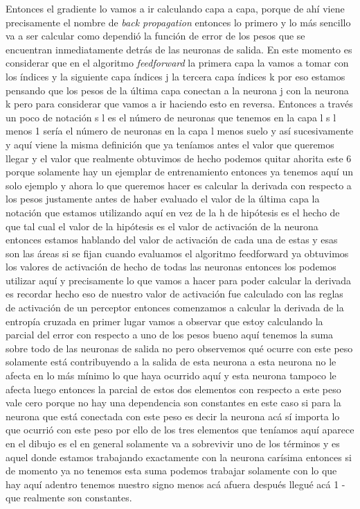 Entonces el gradiente lo vamos a ir calculando capa a capa, porque de ahí viene precisamente el nombre de \emph{back propagation} entonces lo primero y lo más sencillo va a ser calcular como dependió la función de error de los pesos que se encuentran inmediatamente detrás de las neuronas de salida. En este momento es considerar que en el algoritmo \emph{feedforward} la primera capa la vamos a tomar con los índices y la siguiente capa índices j la tercera capa índices k por eso estamos pensando que los pesos de la última capa conectan a la neurona j con la neurona k pero para considerar que vamos a ir haciendo esto en reversa. 
Entonces a través un poco de notación s l es el número de neuronas que tenemos en la capa l s l menos 1 sería el número de neuronas en la capa l menos suelo y así sucesivamente y aquí viene la misma definición que ya teníamos antes el valor que queremos llegar y el valor que realmente obtuvimos de hecho podemos quitar ahorita este 6 porque solamente hay un ejemplar de entrenamiento entonces ya tenemos aquí un solo ejemplo y ahora lo que queremos hacer es calcular la derivada con respecto a los pesos justamente antes de haber evaluado el valor de la última capa la notación que estamos utilizando aquí en vez de la h de hipótesis es el hecho de que tal cual el valor de la hipótesis es el valor de activación de la neurona entonces estamos hablando del valor de activación de cada una de estas y esas son las áreas si se fijan cuando evaluamos el algoritmo feedforward ya obtuvimos los valores de activación de hecho de todas las neuronas entonces los podemos utilizar aquí y precisamente lo que vamos a hacer para poder calcular la derivada es recordar hecho eso de nuestro valor de activación fue calculado con las reglas de activación de un perceptor entonces comenzamos a calcular la derivada de la entropía cruzada en primer lugar vamos a observar que estoy calculando la parcial del error con respecto a uno de los pesos bueno aquí tenemos la suma sobre todo de las neuronas de salida no pero observemos qué ocurre con este peso solamente está contribuyendo a la salida de esta neurona a esta neurona no le afecta en lo más mínimo lo que haya ocurrido aquí y esta neurona tampoco le afecta luego entonces la parcial de estos dos elementos con respecto a este peso vale cero porque no hay una dependencia son constantes en este caso si para la neurona que está conectada con este peso es decir la neurona acá sí importa lo que ocurrió con este peso por ello de los tres elementos que teníamos aquí aparece en el dibujo es el en general solamente va a sobrevivir uno de los términos y es aquel donde estamos trabajando exactamente con la neurona carísima entonces si de momento ya no tenemos esta suma podemos trabajar solamente con lo que hay aquí adentro tenemos nuestro signo menos acá afuera después llegué acá 1 - que realmente son constantes.
